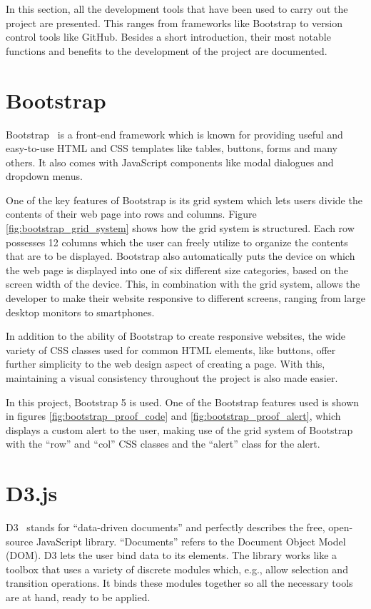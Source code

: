 
In this section, all the development tools that have been used to carry out the project are presented. This ranges from frameworks like Bootstrap to version control tools like GitHub. Besides a short introduction, their most notable functions and benefits to the development of the project are documented.

\section{Bootstrap}
Bootstrap~\cite{bootstrap5_tutorial} is a front-end framework which is known for providing useful and easy-to-use HTML and CSS templates like tables, buttons, forms and many others. It also comes with JavaScript components like modal dialogues and dropdown menus.

One of the key features of Bootstrap is its grid system which lets users divide the contents of their web page into rows and columns. Figure \ref{fig:bootstrap_grid_system} shows how the grid system is structured.
Each row possesses 12 columns which the user can freely utilize to organize the contents that are to be displayed. Bootstrap also automatically puts the device on which the web page is displayed into one of six different size categories, based on the screen width of the device. This, in combination with the grid system, allows the developer to make their website responsive to different screens, ranging from large desktop monitors to smartphones.

In addition to the ability of Bootstrap to create responsive websites, the wide variety of CSS classes used for common HTML elements, like buttons, offer further simplicity to the web design aspect of creating a page. With this, maintaining a visual consistency throughout the project is also made easier.

In this project, Bootstrap 5 is used. One of the Bootstrap features used is shown in figures \ref{fig:bootstrap_proof_code} and \ref{fig:bootstrap_proof_alert}, which displays a custom alert to the user, making use of the grid system of Bootstrap with the ``row'' and ``col'' CSS classes and the ``alert'' class for the alert.

\section{D3.js} \label{d3js}
D3~\cite{d3js_what_is_d3} stands for ``data-driven documents'' and perfectly describes the free, open-source JavaScript library. ``Documents'' refers to the Document Object Model (DOM). D3 lets the user bind data to its elements. The library works like a toolbox that uses a variety of discrete modules which, e.g., allow selection and transition operations. It binds these modules together so all the necessary tools are at hand, ready to be applied.

